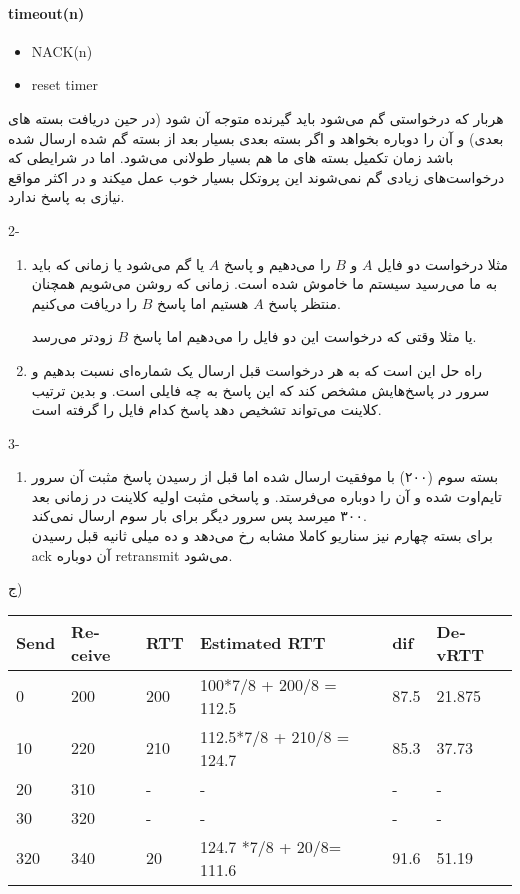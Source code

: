 \begin{latin}
\paragraph{timeout(n)}
	\begin{itemize}
		\item NACK(n)
		\item reset timer
	\end{itemize}
	
	
\end{latin}

هربار که درخواستی گم می‌شود باید گیرنده متوجه آن شود (در حین دریافت بسته های بعدی) و آن را دوباره بخواهد و اگر بسته بعدی بسیار بعد از بسته گم شده ارسال شده باشد زمان تکمیل بسته های ما هم بسیار طولانی می‌شود.
اما در شرایطی که درخواست‌های زیادی گم نمی‌شوند این پروتکل بسیار خوب عمل میکند و در اکثر مواقع نیازی به پاسخ ندارد.

2-
\begin{enumerate}[label = \alph*]
	\item مثلا درخواست دو فایل 
	$A$ و $B$
		را می‌دهیم 
و پاسخ 
$A$
یا گم می‌شود یا زمانی که باید به ما می‌رسید سیستم ما خاموش شده است.
زمانی که روشن می‌شویم همچنان منتظر پاسخ $A$ هستیم اما پاسخ $B$ را دریافت می‌کنیم.

یا مثلا وقتی که درخواست این دو فایل را می‌دهیم اما پاسخ $B$ زودتر می‌رسد.

	\item راه حل این است که به هر درخواست قبل ارسال یک شماره‌ای نسبت بدهیم 
	و سرور در پاسخ‌هایش مشخص کند که این پاسخ به چه فایلی است.
	و بدین ترتیب کلاینت می‌تواند تشخیص دهد پاسخ کدام فایل را گرفته است.
\end{enumerate}

3- 
\begin{enumerate}[label = \alph*]
	\item بسته سوم (۲۰۰) با موفقیت ارسال شده اما قبل از رسیدن پاسخ مثبت آن سرور تایم‌اوت شده و آن را دوباره می‌فرستد. و پاسخی مثبت اولیه کلاینت در زمانی بعد ۳۰۰ میرسد پس سرور دیگر برای بار سوم ارسال نمی‌کند. \\
	برای بسته چهارم نیز سناریو کاملا مشابه رخ می‌دهد و ده میلی ثانیه قبل رسیدن ack آن دوباره retransmit 
	می‌شود.	
\end{enumerate}

ج)

\begin{latin}
\begin{tabular}{ |p{1.2cm}|p{1.2cm}|p{1.2cm}|p{5.2cm}|p{1.5cm}|p{2cm}|  }
 \hline
Send &Receive
 &
 RTT & Estimated RTT & dif & DevRTT\\
 \hline
 0	&	200 & 200 & 100*7/8 + 200/8 = 112.5 & 87.5 & 21.875 \\
 10	&	220 & 210 & 112.5*7/8 + 210/8 = 124.7 & 85.3&  37.73 \\
 20	&	310  & - & - & - & -\\
 30	&	320 & - & - & - & -\\
 320 &	340 & 20 & 124.7 *7/8 + 20/8= 111.6 & 91.6 &  51.19 \\
 \hline
\end{tabular}
\end{latin}

